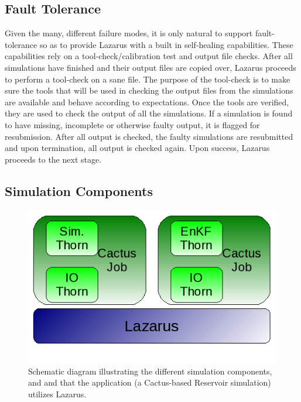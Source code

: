\documentclass{sig-alternate}
\newcommand{\up}{\vspace*{-0.3em}}
\begin{document}
\subsection{Fault Tolerance}
Given the many, different failure modes, it is only natural to support
fault-tolerance so as to provide Lazarus with a built in self-healing
capabilities. These capabilities rely on a tool-check/calibration test
and output file checks. After all simulations have finished and their
output files are copied over, Lazarus proceeds to perform a tool-check
on a sane file. The purpose of the tool-check is to make sure the
tools that will be used in checking the output files from the
simulations are available and behave according to expectations. Once
the tools are verified, they are used to check the output of all the
simulations. If a simulation is found to have missing, incomplete or
otherwise faulty output, it is flagged for resubmission.  After all
output is checked, the faulty simulations are resubmitted and upon
termination, all output is checked again. Upon success, Lazarus
proceeds to the next stage.


\subsection{Simulation Components}
\begin{figure}
\begin{center}
\includegraphics[scale=0.5]{./figures/Simulations.png}
\caption{Schematic diagram illustrating the different simulation components, and and that the application (a Cactus-based Reservoir
  simulation) utilizes Lazarus.}\label{fig:application_usage} 
\up\up\up \up\up\up \up\up\up \up\up\up \up
\end{center} 
\end{figure}
 
\end{document}
